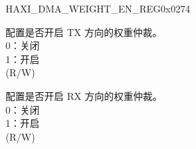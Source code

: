 \begin{register}{H}{AXI\_DMA\_WEIGHT\_EN\_REG}{0x0274}\label{regdesc:AXIDMAWEIGHTENREG}
%
%
%
\regnewline%
\begin{regdesc}\begin{reglist}
\label{fielddesc:AXIDMAWEIGHTENTX}\item [AXI\_DMA\_WEIGHT\_EN\_TX] 配置是否开启 TX 方向的权重仲裁。\\
0：关闭\\
1：开启\\ (R/W)
\label{fielddesc:AXIDMAWEIGHTENRX}\item [AXI\_DMA\_WEIGHT\_EN\_RX] 配置是否开启 RX 方向的权重仲裁。\\
0：关闭\\
1：开启\\ (R/W)
\end{reglist}\end{regdesc}
\end{register}



